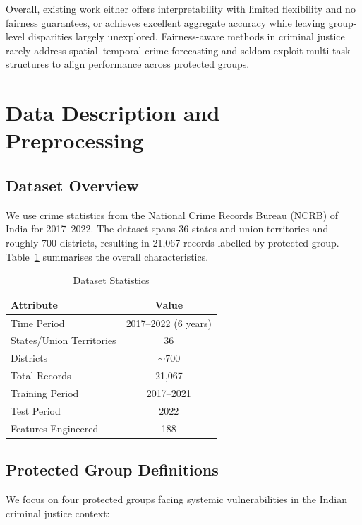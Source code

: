 \documentclass{svproc}
\begin{document}
Overall, existing work either offers interpretability with limited flexibility and no fairness guarantees, or achieves excellent aggregate accuracy while leaving group-level disparities largely unexplored. Fairness-aware methods in criminal justice rarely address spatial–temporal crime forecasting and seldom exploit multi-task structures to align performance across protected groups.

\section{Data Description and Preprocessing}

\subsection{Dataset Overview}

We use crime statistics from the National Crime Records Bureau (NCRB) of India for 2017--2022. The dataset spans 36 states and union territories and roughly 700 districts, resulting in 21{,}067 records labelled by protected group. Table~\ref{tab:dataset_stats} summarises the overall characteristics.

\begin{table}[htbp]
\caption{Dataset Statistics}
\label{tab:dataset_stats}
\centering
\begin{tabular}{lc}
\toprule
\textbf{Attribute} & \textbf{Value} \\
\midrule
Time Period & 2017--2022 (6 years) \\
States/Union Territories & 36 \\
Districts & $\sim$700 \\
Total Records & 21,067 \\
Training Period & 2017--2021 \\
Test Period & 2022 \\
Features Engineered & 188 \\
\bottomrule
\end{tabular}
\end{table}

\subsection{Protected Group Definitions}

We focus on four protected groups facing systemic vulnerabilities in the Indian criminal justice context:
\end{document}
